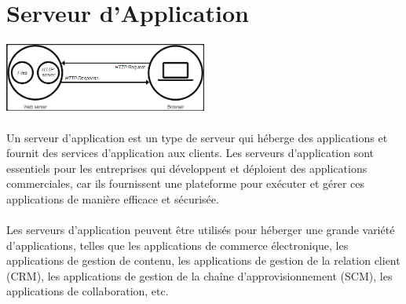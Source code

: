 \section{Serveur d'Application}
\vspace{4mm}
\paragraph{
	\includegraphics[width=0.5\textwidth]{Server_web.png}}
\paragraph{ }

Un serveur d'application est un type de serveur qui héberge des applications et fournit des services d'application aux clients. Les serveurs d'application sont essentiels pour les entreprises qui développent et déploient des applications commerciales, car ils fournissent une plateforme pour exécuter et gérer ces applications de manière efficace et sécurisée.
\paragraph{ }
Les serveurs d'application peuvent être utilisés pour héberger une grande variété d'applications, telles que les applications de commerce électronique, les applications de gestion de contenu, les applications de gestion de la relation client (CRM), les applications de gestion de la chaîne d'approvisionnement (SCM), les applications de collaboration, etc.

